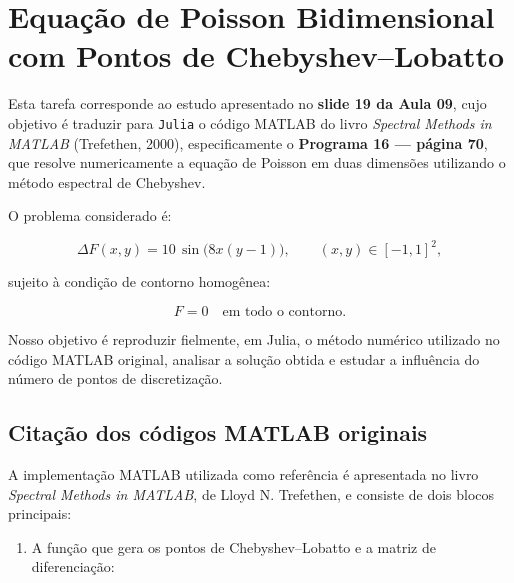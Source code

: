 \documentclass[12pt,a4paper]{article}
\begin{document}


\section{Equação de Poisson Bidimensional com Pontos de Chebyshev--Lobatto}

Esta tarefa corresponde ao estudo apresentado no \textbf{slide 19 da Aula 09}, cujo objetivo é traduzir para \texttt{Julia} o código MATLAB do livro \emph{Spectral Methods in MATLAB} (Trefethen, 2000), especificamente o \textbf{Programa 16 --- página 70}, que resolve numericamente a equação de Poisson em duas dimensões utilizando o método espectral de Chebyshev.

O problema considerado é:

\begin{equation}
\Delta F(x,y)
=
10 \,\sin\!\big( 8x(y-1) \big),
\qquad (x,y)\in[-1,1]^2,
\end{equation}

sujeito à condição de contorno homogênea:

\[
F = 0 \quad \text{em todo o contorno}.
\]

Nosso objetivo é reproduzir fielmente, em Julia, o método numérico utilizado no código MATLAB original, analisar a solução obtida e estudar a influência do número de pontos de discretização.

\subsection{Citação dos códigos MATLAB originais}

A implementação MATLAB utilizada como referência é apresentada no livro \emph{Spectral Methods in MATLAB}, de Lloyd N. Trefethen, e consiste de dois blocos principais:

\begin{enumerate}
    \item A função que gera os pontos de Chebyshev–Lobatto e a matriz de diferenciação:
\end{enumerate}
\end{document}
